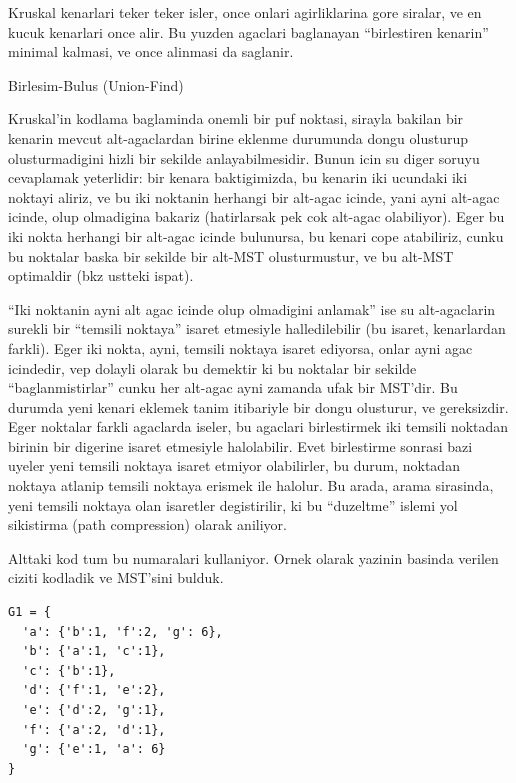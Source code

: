\documentclass[12pt,fleqn]{article}\usepackage{../common}
\begin{document}
Kruskal kenarlari teker teker isler, once onlari agirliklarina gore
siralar, ve en kucuk kenarlari once alir. Bu yuzden agaclari baglanayan
``birlestiren kenarin'' minimal kalmasi, ve once alinmasi da saglanir.

Birlesim-Bulus (Union-Find)

Kruskal'in kodlama baglaminda onemli bir puf noktasi, sirayla bakilan bir
kenarin mevcut alt-agaclardan birine eklenme durumunda dongu olusturup
olusturmadigini hizli bir sekilde anlayabilmesidir. Bunun icin su diger
soruyu cevaplamak yeterlidir: bir kenara baktigimizda, bu kenarin iki
ucundaki iki noktayi aliriz, ve bu iki noktanin herhangi bir alt-agac
icinde, yani ayni alt-agac icinde, olup olmadigina bakariz (hatirlarsak pek
cok alt-agac olabiliyor). Eger bu iki nokta herhangi bir alt-agac icinde
bulunursa, bu kenari cope atabiliriz, cunku bu noktalar baska bir sekilde
bir alt-MST olusturmustur, ve bu alt-MST optimaldir (bkz ustteki ispat).

``Iki noktanin ayni alt agac icinde olup olmadigini anlamak'' ise su
alt-agaclarin surekli bir ``temsili noktaya'' isaret etmesiyle
halledilebilir (bu isaret, kenarlardan farkli). Eger iki nokta, ayni,
temsili noktaya isaret ediyorsa, onlar ayni agac icindedir, vep dolayli
olarak bu demektir ki bu noktalar bir sekilde ``baglanmistirlar'' cunku her
alt-agac ayni zamanda ufak bir MST'dir. Bu durumda yeni kenari eklemek
tanim itibariyle bir dongu olusturur, ve gereksizdir. Eger noktalar farkli
agaclarda iseler, bu agaclari birlestirmek iki temsili noktadan birinin bir
digerine isaret etmesiyle halolabilir. Evet birlestirme sonrasi bazi uyeler
yeni temsili noktaya isaret etmiyor olabilirler, bu durum, noktadan noktaya
atlanip temsili noktaya erismek ile halolur. Bu arada, arama sirasinda,
yeni temsili noktaya olan isaretler degistirilir, ki bu ``duzeltme'' islemi
yol sikistirma (path compression) olarak aniliyor.

Alttaki kod tum bu numaralari kullaniyor. Ornek olarak yazinin basinda
verilen ciziti kodladik ve MST'sini bulduk.

\begin{verbatim}
G1 = {
  'a': {'b':1, 'f':2, 'g': 6},
  'b': {'a':1, 'c':1},
  'c': {'b':1},
  'd': {'f':1, 'e':2},
  'e': {'d':2, 'g':1},
  'f': {'a':2, 'd':1},
  'g': {'e':1, 'a': 6}
}
\end{verbatim}
\end{document}
